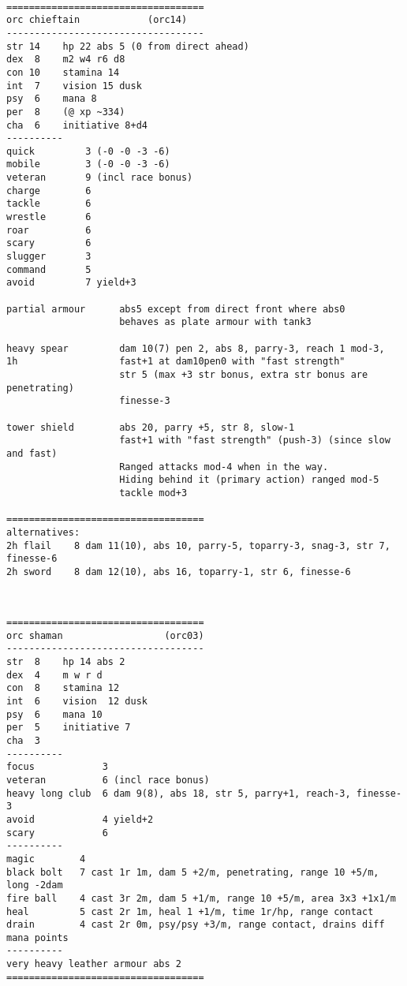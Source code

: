 \

\pagebreak[1]
\tiny \begin{samepage} \begin{verbatim}
===================================
orc chieftain            (orc14)
-----------------------------------
str 14    hp 22 abs 5 (0 from direct ahead)
dex  8    m2 w4 r6 d8
con 10    stamina 14
int  7    vision 15 dusk
psy  6    mana 8
per  8    (@ xp ~334)
cha  6    initiative 8+d4
----------
quick         3 (-0 -0 -3 -6)
mobile        3 (-0 -0 -3 -6)
veteran       9 (incl race bonus)
charge        6
tackle        6
wrestle       6
roar          6
scary         6
slugger       3
command       5
avoid         7 yield+3

partial armour      abs5 except from direct front where abs0
                    behaves as plate armour with tank3

heavy spear         dam 10(7) pen 2, abs 8, parry-3, reach 1 mod-3,
1h                  fast+1 at dam10pen0 with "fast strength"
                    str 5 (max +3 str bonus, extra str bonus are penetrating)
                    finesse-3

tower shield        abs 20, parry +5, str 8, slow-1
                    fast+1 with "fast strength" (push-3) (since slow and fast)
                    Ranged attacks mod-4 when in the way.
                    Hiding behind it (primary action) ranged mod-5
                    tackle mod+3

===================================
alternatives:
2h flail    8 dam 11(10), abs 10, parry-5, toparry-3, snag-3, str 7, finesse-6
2h sword    8 dam 12(10), abs 16, toparry-1, str 6, finesse-6
\end{verbatim} \end{samepage} \normalsize

\

\pagebreak[1]
\tiny \begin{samepage} \begin{verbatim}
===================================
orc shaman                  (orc03)
-----------------------------------
str  8    hp 14 abs 2
dex  4    m w r d
con  8    stamina 12
int  6    vision  12 dusk
psy  6    mana 10
per  5    initiative 7
cha  3
----------
focus            3
veteran          6 (incl race bonus)
heavy long club  6 dam 9(8), abs 18, str 5, parry+1, reach-3, finesse-3
avoid            4 yield+2
scary            6
----------
magic        4
black bolt   7 cast 1r 1m, dam 5 +2/m, penetrating, range 10 +5/m, long -2dam
fire ball    4 cast 3r 2m, dam 5 +1/m, range 10 +5/m, area 3x3 +1x1/m
heal         5 cast 2r 1m, heal 1 +1/m, time 1r/hp, range contact
drain        4 cast 2r 0m, psy/psy +3/m, range contact, drains diff mana points
----------
very heavy leather armour abs 2
===================================
\end{verbatim} \end{samepage} \normalsize





